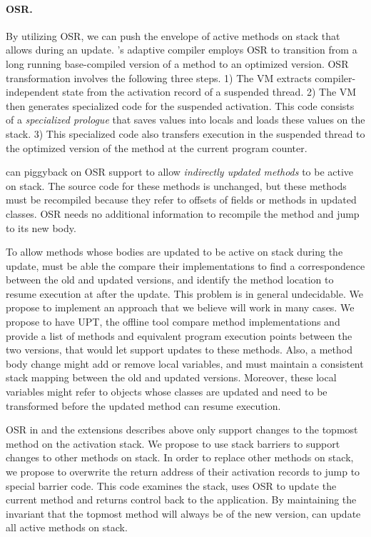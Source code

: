 
\paragraph{\acf{OSR}.}
\label{paragraph:osr}

By utilizing \acs{OSR}, we can push the envelope of active methods on stack
that \DSU{} allows during an update. \JikesRVM{}'s adaptive compiler
employs \acs{OSR} \cite{Fink:CGO:03} to transition from a long running
base-compiled version of a method to an optimized version. OSR
transformation involves the following three steps. 1) The VM extracts
compiler-independent state from the activation record of a suspended
thread. 2) The VM then generates specialized code for the suspended
activation. This code consists of a \emph{specialized prologue} that saves
values into locals and loads these values on the stack. 3) This specialized
code also transfers execution in the suspended thread to the optimized
version of the method at the current program counter.

\DSU{} can piggyback on OSR support to allow \emph{indirectly updated
methods} to be active on stack. The source code for these methods is
unchanged, but these methods must be recompiled because they refer to
offsets of fields or methods in updated classes. OSR needs no additional
information to recompile the method and jump to its new body.

To allow methods whose bodies are updated to be active on stack during the
update, \DSU{} must be able the compare their implementations to find a
correspondence between the old and updated versions, and identify the
method location to resume execution at after the update. This problem is in
general undecidable. We propose to implement an approach that we believe
will work in many cases. We propose to have \acs{UPT}, the offline tool
compare method implementations and provide \DSU{} a list of
methods and equivalent program execution points between the two versions,
that would let \DSU{} support updates to these methods.
Also, a
method body change might add or remove local variables, and \DSU{} must
maintain a consistent stack mapping between the old and updated versions.
Moreover, these local variables might refer to objects whose classes are
updated and need to be transformed before the updated method can resume
execution.

\acs{OSR} in \JikesRVM{} and the extensions describes above only support
changes to the topmost method on the activation stack. We propose to use
stack barriers to support changes to other methods on stack. In order to
replace other methods on stack, we propose to overwrite the return address
of their activation records to jump to special barrier code. This code
examines the stack, uses \acs{OSR} to update the current method and returns
control back to the application. By maintaining the invariant that the
topmost method will always be of the new version, \DSU{} can update all
active methods on stack.
